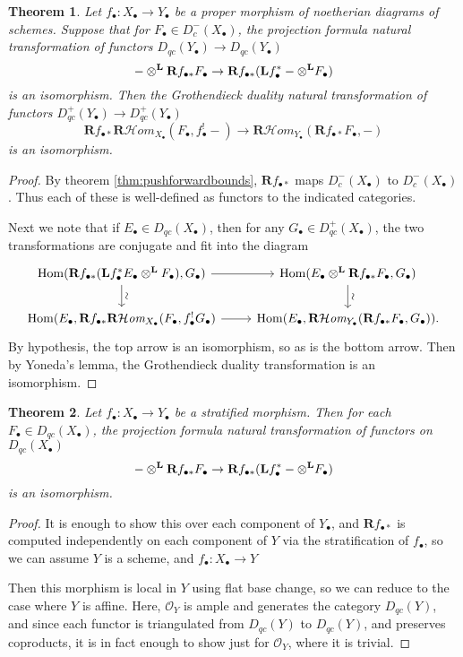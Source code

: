 \documentclass{amsart}
\newtheorem{theorem}{Theorem}
\theoremstyle{definition}
\DeclareMathOperator{\Hom}{Hom}
\newcommand{\cHom}{\mathcal{H} \textit{om}}
\newcommand{\bL}{\textbf{L}}
\newcommand{\OO}{\mathcal{O}}
\newcommand{\bR}{\textbf{R}}
\newcommand{\otimesL}{\otimes^{\bf L}}
\begin{document}
\begin{theorem}
	Let $f_\bullet : X_\bullet \rightarrow Y_\bullet$ be a proper morphism of noetherian diagrams of schemes.
	Suppose that for $F_\bullet \in D_{c}^-(X_\bullet)$, the projection formula natural transformation of functors $D_{qc}(Y_\bullet) \rightarrow D_{qc}(Y_\bullet)$
	\[
		- \otimesL \bR f_{\bullet *} F_\bullet \rightarrow \bR f_{\bullet *}(\bL f_\bullet^* - \otimesL F_\bullet)
	\]
	is an isomorphism.
	Then the Grothendieck duality natural transformation of functors $D_{qc}^+(Y_\bullet) \rightarrow D_{qc}^+(Y_\bullet)$
	\[
		\bR f_{\bullet *} \bR \cHom_{X_\bullet} (F_\bullet, f_\bullet^! -) \rightarrow \bR \cHom_{Y_\bullet} (\bR f_{\bullet *} F_\bullet, -)
	\]
	is an isomorphism.
\end{theorem}
\begin{proof}
	By theorem \ref{thm:pushforwardbounds}, $\bR f_{\bullet *}$ maps $D^-_{c}(X_\bullet)$ to $D_c^-(X_\bullet)$.
	Thus each of these is well-defined as functors to the indicated categories.
	
	Next we note that if $E_\bullet \in D_{qc}(X_\bullet)$, then for any $G_\bullet \in D_{qc}^+(X_\bullet)$, the two transformations are conjugate and fit into the diagram
	\[
	\begin{tikzcd}
		\Hom(\bR f_{\bullet *}(\bL f_\bullet^* E_\bullet \otimesL F_\bullet), G_\bullet) \arrow{d}[sloped, above]{\sim} \arrow{r} & \Hom(E_\bullet \otimesL \bR f_{\bullet *} F_\bullet, G_\bullet) \arrow{d}[sloped, above]{\sim} \\
		\Hom(E_\bullet, \bR f_{\bullet *} \bR \cHom_{X_\bullet} (F_\bullet, f_\bullet^! G_\bullet) \arrow{r} & \Hom(E_\bullet, \bR \cHom_{Y_\bullet} (\bR f_{\bullet *} F_\bullet, G_\bullet)).
	\end{tikzcd}
	\]
	By hypothesis, the top arrow is an isomorphism, so as is the bottom arrow.
	Then by Yoneda's lemma, the Grothendieck duality transformation is an isomorphism.
\end{proof}

\begin{theorem}
	Let $f_\bullet : X_\bullet \rightarrow Y_\bullet$ be a stratified morphism.
	Then for each $F_\bullet \in D_{qc}(X_\bullet)$, the projection formula natural transformation of functors on $D_{qc}(X_\bullet)$
	\[
	- \otimesL \bR f_{\bullet *} F_\bullet \rightarrow \bR f_{\bullet *}(\bL f_\bullet^* - \otimesL F_\bullet)
	\]
	is an isomorphism.
\end{theorem}
\begin{proof}	
	It is enough to show this over each component of $Y_\bullet$, and $\bR f_{\bullet *}$ is computed independently on each component of $Y$ via the stratification of $f_\bullet$, so we can assume $Y$ is a scheme, and $f_\bullet : X_\bullet \rightarrow Y$
	
	Then this morphism is local in $Y$ using flat base change, so we can reduce to the case where $Y$ is affine.
	Here, $\OO_Y$ is ample and generates the category $D_{qc}(Y)$, and since each functor is triangulated from $D_{qc}(Y)$ to $D_{qc}(Y)$, and preserves coproducts, it is in fact enough to show just for $\OO_Y$, where it is trivial.
\end{proof}
\end{document}
